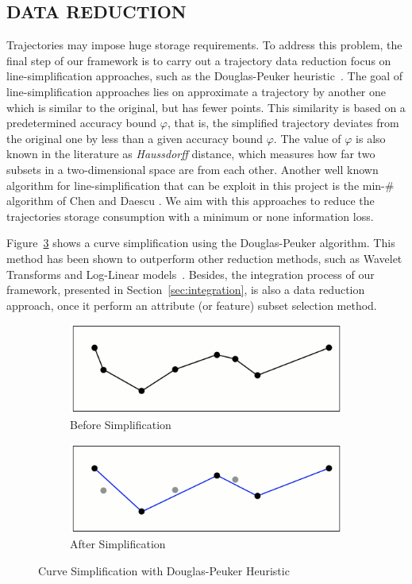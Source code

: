 \documentclass[a4paper,12pt]{article}
\begin{document}
\subsection{DATA REDUCTION}\label{sec:reduction}
Trajectories may impose huge storage requirements. To address this problem, the final step of our framework is to carry out a trajectory data reduction focus on line-simplification approaches, such as the Douglas-Peuker heuristic~\cite{douglas73}. The goal of line-simplification approaches lies on approximate a trajectory by another one which is similar to the original, but has fewer points. This similarity is based on a predetermined accuracy bound $\varphi$, that is, the simplified trajectory deviates from the original one by less than a given accuracy bound $\varphi$. The value of $\varphi$ is also known in the literature as \textit{Haussdorff} distance, which measures how far two subsets in a two-dimensional space are from each other. Another well known algorithm for line-simplification that can be exploit in this project is the min-\# algorithm of Chen and Daescu \cite{chen98}. We aim with this approaches to reduce the trajectories storage consumption with a minimum or none information loss.

Figure~\ref{fig:fig8} shows a curve simplification using the Douglas-Peuker algorithm. This method has been shown to outperform other reduction methods, such as Wavelet Transforms and Log-Linear models~\cite{cao2006}. Besides, the integration process of our framework, presented in Section~\ref{sec:integration}, is also a data reduction approach, once it perform an attribute (or feature) subset selection method.

\begin{figure}[!h]
	\centering
	\begin{subfigure}{0.49\textwidth}
		 \centering
		 \label{fig8a}
		 \includegraphics[scale=0.7]{reduce1}
		 \caption{Before Simplification}
	\end{subfigure}
	\hfill 
	\begin{subfigure}{0.49\textwidth}
		 \centering
		 \label{fig8b}
		 \includegraphics[scale=0.7]{reduce2}
		 \caption{After Simplification}
	\end{subfigure}
	\caption{Curve Simplification with Douglas-Peuker Heuristic}
	\label{fig:fig8}
\end{figure}
\end{document}
